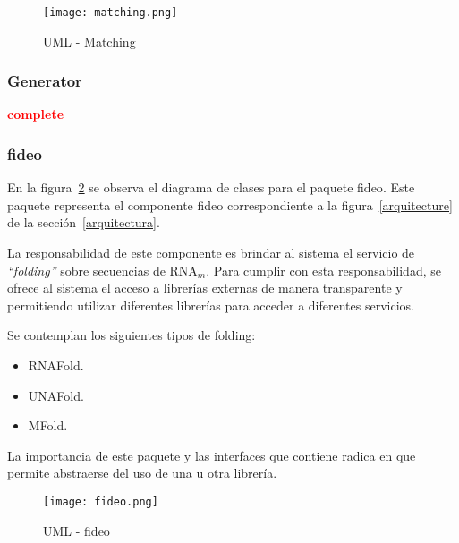 \begin{figure}[!hbtp]
	\begin{center}
		\texttt{[image: matching.png]}
		\caption{UML - Matching}
		\label{matching}
	\end{center}
\end{figure}


\subsubsection{Generator}
	\textcolor{red}{\textbf{complete}}

\subsubsection{fideo}
\par En la figura~\ref{fideopackage} se observa el diagrama de clases para el paquete \textsf{fideo}. Este paquete representa el componente \textsf{fideo} correspondiente a la figura~\ref{arquitecture} de la sección~\ref{arquitectura}.
\par La responsabilidad de este componente es brindar al sistema el servicio de \emph{``folding''} sobre secuencias de RNA$_m$. Para cumplir con esta responsabilidad, se ofrece al sistema el acceso a librerías externas de manera transparente y
permitiendo utilizar diferentes librerías para acceder a diferentes servicios. 
\par Se contemplan los siguientes tipos de folding:
\begin{itemize}
	\item RNAFold.
	\item UNAFold.
	\item MFold.
\end{itemize}
\par La importancia de este paquete y las interfaces que contiene radica en que permite abstraerse del uso de una u otra librería.

\begin{figure}[!hbtp]
	\begin{center}
		\texttt{[image: fideo.png]}
		\caption{UML - fideo}
		\label{fideopackage}
	\end{center}
\end{figure}
